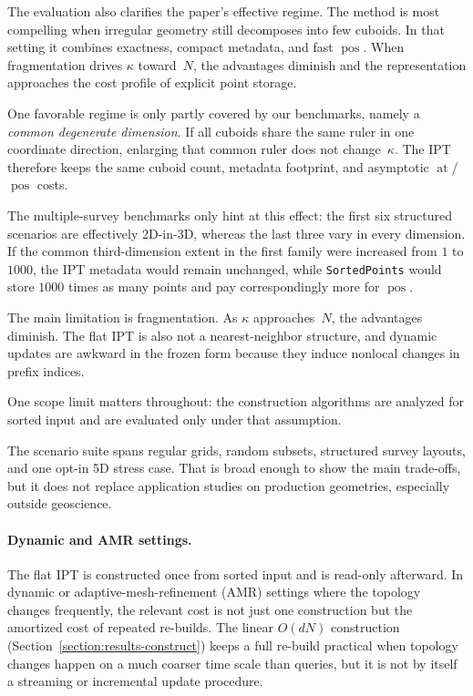 \documentclass[manuscript,screen,review]{acmart}
\theoremstyle{definition}
\theoremstyle{plain}
\begin{document}
The evaluation also clarifies the paper's effective regime. The method
is most compelling when irregular geometry still decomposes into few
cuboids. In that setting it combines exactness, compact metadata, and
fast $\operatorname{pos}$. When fragmentation drives $\kappa$ toward~$N$, the
advantages diminish and the representation approaches the cost profile
of explicit point storage.

One favorable regime is only partly covered by our benchmarks, namely
a \emph{common degenerate dimension}. If all cuboids share the same
ruler in one coordinate direction, enlarging that common ruler does
not change~$\kappa$. The IPT therefore keeps the same cuboid count,
metadata footprint, and asymptotic $\operatorname{at}$/$\operatorname{pos}$ costs.

The multiple-survey benchmarks only hint at this effect: the first six
structured scenarios are effectively 2D-in-3D, whereas the last three
vary in every dimension. If the common third-dimension extent in the
first family were increased from $1$ to $1000$, the IPT metadata would
remain unchanged, while \texttt{SortedPoints} would store $1000$ times
as many points and pay correspondingly more for $\operatorname{pos}$.

The main limitation is fragmentation. As $\kappa$ approaches~$N$, the
advantages diminish. The flat IPT is also not a nearest-neighbor
structure, and dynamic updates are awkward in the frozen form because
they induce nonlocal changes in prefix indices.

One scope limit matters throughout: the construction algorithms are
analyzed for sorted input and are evaluated only under that assumption.

The scenario suite spans regular grids, random subsets, structured
survey layouts, and one opt-in 5D stress case. That is broad enough to
show the main trade-offs, but it does not replace application studies
on production geometries, especially outside geoscience.

\paragraph{Dynamic and AMR settings.}
The flat IPT is constructed once from sorted input and is read-only
afterward. In dynamic or adaptive-mesh-refinement (AMR) settings where
the topology changes frequently, the relevant cost is not just one
construction but the amortized cost of repeated re-builds. The linear
$O(dN)$ construction (Section~\ref{section:results-construct}) keeps a
full re-build practical when topology changes happen on a much coarser
time scale than queries, but it is not by itself a streaming or
incremental update procedure.
\end{document}
